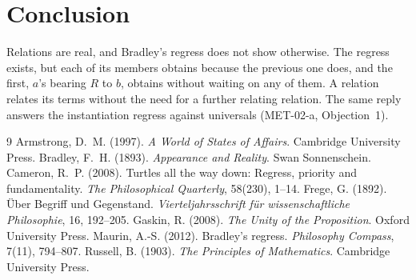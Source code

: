 \documentclass{situationist-preprint}
\begin{document}
\section{Conclusion}

Relations are real, and Bradley's regress does not show otherwise. The regress exists, but each of its members obtains because the previous one does, and the first, $a$'s bearing $R$ to $b$, obtains without waiting on any of them. A relation relates its terms without the need for a further relating relation. The same reply answers the instantiation regress against universals (MET-02-a, Objection~1).

\begin{thebibliography}{9}\small
{} Armstrong, D.~M. (1997). \emph{A World of States of Affairs}. Cambridge University Press.
 Bradley, F.~H. (1893). \emph{Appearance and Reality}. Swan Sonnenschein.
 Cameron, R.~P. (2008). Turtles all the way down: Regress, priority and fundamentality. \emph{The Philosophical Quarterly}, 58(230), 1--14.
 Frege, G. (1892). \"Uber Begriff und Gegenstand. \emph{Vierteljahrsschrift f\"ur wissenschaftliche Philosophie}, 16, 192--205.
 Gaskin, R. (2008). \emph{The Unity of the Proposition}. Oxford University Press.
 Maurin, A.-S. (2012). Bradley's regress. \emph{Philosophy Compass}, 7(11), 794--807.
 Russell, B. (1903). \emph{The Principles of Mathematics}. Cambridge University Press.
\end{thebibliography}
\end{document}
